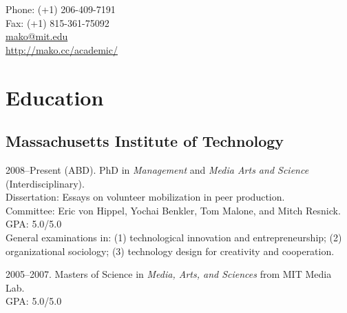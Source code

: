 \documentclass[10pt]{article}
\makeatletter
\def\myemail{mako@mit.edu}
\def\myweb{http://mako.cc/academic/}
\def\myphone{(+1) 206-409-7191}
\def\myfax{(+1) 815-361-75092}
\newenvironment{cvlist}{
\begin{list}{}{\leftmargin=3.0em \itemindent=-3.0em}
  \setlength{\itemsep}{0pt}
  \setlength{\parskip}{0em}
  \setlength{\parsep}{1em}
  \setlength{\parindent}{0em}}
{\vspace{1em}
\end{list}}
\makeatother
\begin{document}
\pagestyle{fancy}
\renewcommand{\headrulewidth}{0pt}
\fancyhead{}
\fancyfoot{}
\rhead{{\scriptsize\thepage}}


\begin{minipage}[t]{3in}
  
\end{minipage}
\hfill     
\begin{minipage}[t]{0.0in}
\end{minipage}
\hfill
\begin{minipage}[t]{1.7in}
  \flushright \footnotesize Phone: \myphone \\ 
  Fax: \myfax \\ 
  {\scriptsize \href{mailto:\myemail}{\myemail}} \\
  {\scriptsize  \href{\myweb}{\myweb}}
\end{minipage}

\medskip


\medskip

\section{Education}

\subsection{Massachusetts Institute of Technology}
\begin{cvlist}

\item 2008--Present (ABD). PhD in \emph{Management} and \emph{Media
    Arts and Science} (Interdisciplinary). \\
  Dissertation: Essays on volunteer mobilization in peer production. \\
  Committee: Eric von Hippel, Yochai Benkler, Tom Malone, and
  Mitch Resnick. \\
  GPA: 5.0/5.0 \\
  General examinations in: (1) technological innovation and
  entrepreneurship; (2) organizational sociology; (3) technology
  design for creativity and cooperation.

\item 2005--2007. Masters of Science in \emph{Media, Arts, and
    Sciences} from MIT Media Lab.\\ GPA: 5.0/5.0

\end{cvlist}
\end{document}
